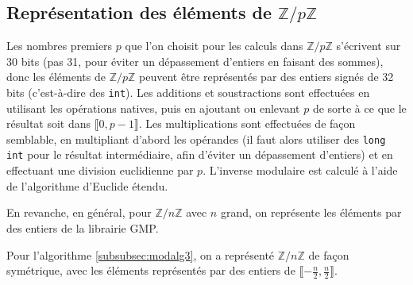 \documentclass[french]{article}
\begin{document}
\subsection{Représentation des éléments de $\mathbb{Z}/p\mathbb{Z}$}
Les nombres premiers $p$ que l'on choisit pour les calculs dans $\mathbb{Z}/p\mathbb{Z}$ s'écrivent sur 30 bits (pas 31, pour éviter un dépassement d'entiers en faisant des sommes), donc les éléments de $\mathbb{Z}/p\mathbb{Z}$ peuvent être représentés par des entiers signés de 32 bits (c'est-à-dire des {\tt int}).
Les additions et soustractions sont effectuées en utilisant les opérations natives, puis en ajoutant ou enlevant $p$ de sorte à ce que le résultat soit dans $\llbracket0,p-1\rrbracket$.
Les multiplications sont effectuées de façon semblable, en multipliant d'abord les opérandes (il faut alors utiliser des {\tt long int} pour le résultat intermédiaire, afin d'éviter un dépassement d'entiers) et en effectuant une division euclidienne par $p$.
L'inverse modulaire est calculé à l'aide de l'algorithme d'Euclide étendu.
\par
En revanche, en général, pour $\mathbb{Z}/n\mathbb{Z}$ avec $n$ grand, on représente les éléments par des entiers de la librairie GMP.
\par
Pour l'algorithme \ref{subsubsec:modalg3}, on a représenté $\mathbb{Z}/n\mathbb{Z}$ de façon symétrique, avec les éléments représentés par des entiers de $\llbracket-\frac{n}{2},\frac{n}{2}\rrbracket$.
\vspace{8cm}
\end{document}
